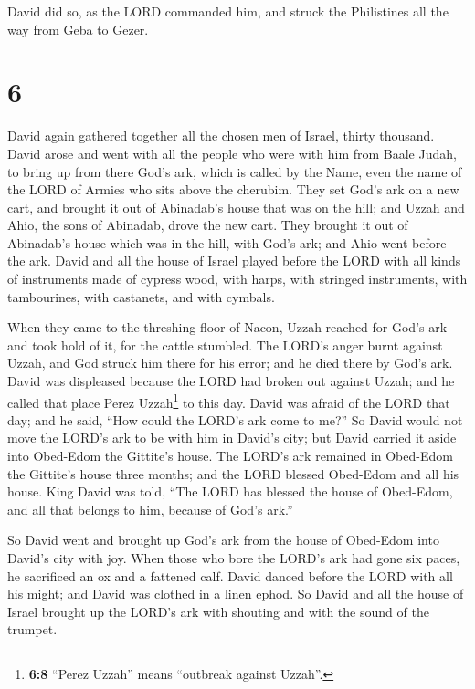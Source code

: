  David did so, as the LORD commanded him, and struck the
Philistines all the way from Geba to Gezer.

\hypertarget{section-5}{%
\section{6}\label{section-5}}

 David again gathered together all the chosen men of
Israel, thirty thousand.  David arose and went with all
the people who were with him from Baale Judah, to bring up from there
God's ark, which is called by the Name, even the name of the LORD of
Armies who sits above the cherubim.  They set God's ark on
a new cart, and brought it out of Abinadab's house that was on the hill;
and Uzzah and Ahio, the sons of Abinadab, drove the new cart.
 They brought it out of Abinadab's house which was in the
hill, with God's ark; and Ahio went before the ark.  David
and all the house of Israel played before the LORD with all kinds of
instruments made of cypress wood, with harps, with stringed instruments,
with tambourines, with castanets, and with cymbals.

 When they came to the threshing floor of Nacon, Uzzah
reached for God's ark and took hold of it, for the cattle stumbled.
 The LORD's anger burnt against Uzzah, and God struck him
there for his error; and he died there by God's ark. 
David was displeased because the LORD had broken out against Uzzah; and
he called that place Perez Uzzah\footnote{\textbf{6:8} ``Perez Uzzah''
  means ``outbreak against Uzzah''.} to this day.  David
was afraid of the LORD that day; and he said, ``How could the LORD's ark
come to me?''  So David would not move the LORD's ark to
be with him in David's city; but David carried it aside into Obed-Edom
the Gittite's house.  The LORD's ark remained in
Obed-Edom the Gittite's house three months; and the LORD blessed
Obed-Edom and all his house.  King David was told, ``The
LORD has blessed the house of Obed-Edom, and all that belongs to him,
because of God's ark.''

So David went and brought up God's ark from the house of Obed-Edom into
David's city with joy.  When those who bore the LORD's
ark had gone six paces, he sacrificed an ox and a fattened calf.
 David danced before the LORD with all his might; and
David was clothed in a linen ephod.  So David and all the
house of Israel brought up the LORD's ark with shouting and with the
sound of the trumpet.

